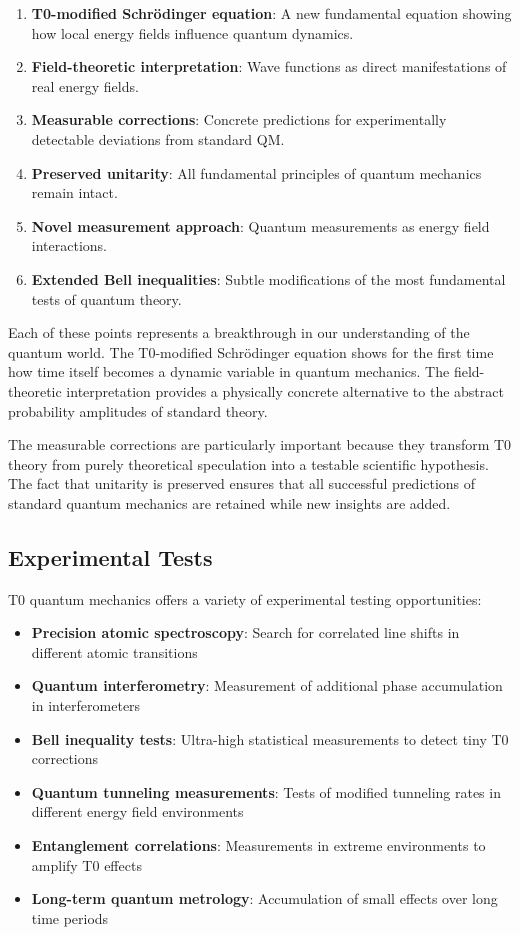 \documentclass[12pt,a4paper]{article}
\theoremstyle{definition}
\theoremstyle{remark}
\begin{document}
\begin{enumerate}
	\item \textbf{T0-modified Schrödinger equation}: A new fundamental equation showing how local energy fields influence quantum dynamics.
	\item \textbf{Field-theoretic interpretation}: Wave functions as direct manifestations of real energy fields.
	\item \textbf{Measurable corrections}: Concrete predictions for experimentally detectable deviations from standard QM.
	\item \textbf{Preserved unitarity}: All fundamental principles of quantum mechanics remain intact.
	\item \textbf{Novel measurement approach}: Quantum measurements as energy field interactions.
	\item \textbf{Extended Bell inequalities}: Subtle modifications of the most fundamental tests of quantum theory.
\end{enumerate}

Each of these points represents a breakthrough in our understanding of the quantum world. The T0-modified Schrödinger equation shows for the first time how time itself becomes a dynamic variable in quantum mechanics. The field-theoretic interpretation provides a physically concrete alternative to the abstract probability amplitudes of standard theory.

The measurable corrections are particularly important because they transform T0 theory from purely theoretical speculation into a testable scientific hypothesis. The fact that unitarity is preserved ensures that all successful predictions of standard quantum mechanics are retained while new insights are added.

\subsection{Experimental Tests}

T0 quantum mechanics offers a variety of experimental testing opportunities:

\begin{itemize}
	\item \textbf{Precision atomic spectroscopy}: Search for correlated line shifts in different atomic transitions
	\item \textbf{Quantum interferometry}: Measurement of additional phase accumulation in interferometers
	\item \textbf{Bell inequality tests}: Ultra-high statistical measurements to detect tiny T0 corrections
	\item \textbf{Quantum tunneling measurements}: Tests of modified tunneling rates in different energy field environments
	\item \textbf{Entanglement correlations}: Measurements in extreme environments to amplify T0 effects
	\item \textbf{Long-term quantum metrology}: Accumulation of small effects over long time periods
\end{itemize}
\end{document}
